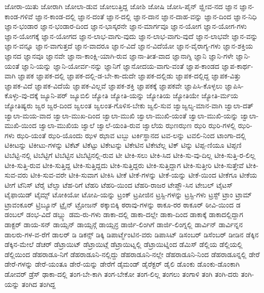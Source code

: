 {ಜೋರಾ-ಯಿತು
ಜೋರಾಗಿ
ಜೋಲಾ-ಡುವ
ಜೋಲುತ್ತಿದ್ದ
ಜೋಶಿ
ಜೋಷಿ
ಜೋಸಿ-ಪೈನ್
ಜ್ಝೀವ-ನದ
ಜ್ಞಾನ
ಜ್ಞಾನ-ಕಾಂಡ-ಗಳಿವೆ
ಜ್ಞಾನ-ಕಾಂಡ-ದಲ್ಲಿ
ಜ್ಞಾನ-ದಂತೆ
ಜ್ಞಾನ-ದಲ್ಲಿ
ಜ್ಞಾನ-ದಾನ
ಜ್ಞಾನ-ದಾಹ-ವನ್ನು
ಜ್ಞಾನ-ದಿಂದ
ಜ್ಞಾನ-ನಿಧಿ
ಜ್ಞಾನ-ಭಂಡಾರ
ಜ್ಞಾನ-ಭಂಡಾರ-ದಿಂದ
ಜ್ಞಾನ-ಭಾಸ್ಕರನೇ
ಜ್ಞಾನ-ಮಾರ್ಗವೂ
ಜ್ಞಾನ-ಯೋಗ
ಜ್ಞಾನ-ಯೋಗ-ಗಳು
ಜ್ಞಾನ-ಯೋಗಕ್ಕೆ
ಜ್ಞಾನ-ಯೋಗದ
ಜ್ಞಾನ-ಲಾಭ-ವಾಗು-ವುದು
ಜ್ಞಾನ-ಲಾಭ-ವಾಗು-ವುದೆ
ಜ್ಞಾನ-ಲಾಭವೇ
ಜ್ಞಾನ-ವನ್ನು
ಜ್ಞಾನ-ವನ್ನೂ
ಜ್ಞಾನ-ವಾಗುತ್ತದೆ
ಜ್ಞಾನ-ವಾದರೂ
ಜ್ಞಾನ-ವಿದೆ
ಜ್ಞಾನ-ವಿದೆಯೋ
ಜ್ಞಾನ-ವೈರಾಗ್ಯ-ಗಳು
ಜ್ಞಾನ-ಶಕ್ತಿಯ
ಜ್ಞಾನದ
ಜ್ಞಾನವೂ
ಜ್ಞಾನವೇ
ಜ್ಞಾನಾ-ಕಾಂಕ್ಷಿ-ಯಾಗಿ-ರುವ
ಜ್ಞಾನಾ-ತೀತ-ವಾದ
ಜ್ಞಾನಾಗ್ನಿ
ಜ್ಞಾನಿ
ಜ್ಞಾನಿ-ಗಳೇ
ಜ್ಞಾನಿ-ಯಂತೆ
ಜ್ಞಾನಿ-ಯನ್ನು
ಜ್ಞಾನಿ-ಯೋರ್ವ-ನನ್ನು
ಜ್ಞಾನಿಗೆ
ಜ್ಞಾನೋದಯ-ವಾಗು-ವಂತೆ
ಜ್ಞಾಪ-ಕಾಂಡದ
ಜ್ಞಾಪ-ಕಾರ್ಥ-ವಾಗಿ
ಜ್ಞಾಪಕ
ಜ್ಞಾಪಕ-ದಲ್ಲಿ
ಜ್ಞಾಪಕ-ದಲ್ಲಿ-ಡ-ಬೇ-ಕಾ-ದುದೇ
ಜ್ಞಾಪಕ-ದಲ್ಲಿಡು
ಜ್ಞಾಪಕ-ದಲ್ಲಿದ್ದ
ಜ್ಞಾಪಕ-ವಿತ್ತು
ಜ್ಞಾಪಕ-ವಿದೆ
ಜ್ಞಾಪಕ-ವಿದೆಯೆ
ಜ್ಞಾಪಕ-ವಿಲ್ಲವೆ
ಜ್ಞಾಪಕ-ಶಕ್ತಿ
ಜ್ಞಾಪಕಕ್ಕೆ
ಜ್ಞಾಪಕವೇ
ಜ್ಞಾಪಿಸಿ-ಕೊಳ್ಳಲು
ಜ್ಞಾಪಿಸಿ-ಕೊಳ್ಳು-ವು-ದಕ್ಕೆ
ಜ್ಯೂನಿ-ಪರ್
ಜ್ಯೂಬಿಲಿ
ಜ್ಯೋತಿ
ಜ್ಯೋತಿ-ಯನ್ನು
ಜ್ಯೋತಿಯ
ಜ್ಯೋತಿಯೇ
ಜ್ಯೋತಿ-ರ್ಮಯ
ಜ್ಯೋತಿಷ್ಯರು
ಜ್ವರ
ಜ್ವರ-ದಿಂದ
ಜ್ವಲಂತ
ಜ್ವಲಂತ-ಗೊಳಿಸ-ಬೇಕು
ಜ್ವಲಿ-ಸುವ
ಜ್ವಾಜ್ವಲ್ಯ-ಮಾನ-ವಾಗಿ
ಜ್ವಾಲಾ-ದತ್
ಜ್ವಾಲಾ-ಮಯ-ವಾದ
ಜ್ವಾಲಾ-ಮುಖ-ದಿಂದ
ಜ್ವಾಲಾ-ಮುಖಿ
ಜ್ವಾಲಾ-ಮುಖಿ-ಯಂತೆ
ಜ್ವಾಲಾ-ಮುಖಿ-ಯನ್ನು
ಜ್ವಾಲಾ-ಮುಖಿ-ಯಿಂದ
ಜ್ವಾಲಾ-ಮುಖಿಯ
ಜ್ವಾಲೆ
ಜ್ವಾಲೆ-ಯಂತಿ-ರುವ
ಜ್ವಾಲೆಯ
ಝಣಝಣ
ಝರಿ
ಝರಿ-ಗಳಲ್ಲಿ
ಝರಿ-ಗಳು
ಝರಿ-ಯಂತೆ
ಝರಿ-ಯೊಂದು
ಝಳ
ಝಾವ
ಟಬ್ಬು
ಟರ್ಕಿಸ್ಥಾನದ
ಟವ-ಲನ್ನು
ಟವಲಿ-ನಿಂದ
ಟಾಂಗಾ-ದಲ್ಲಿ
ಟಿಕೀಟನ್ನು
ಟಿಕೀಟು-ಗಳನ್ನು
ಟಿಕೆಟ್
ಟಿಕೆಟ್ಟು
ಟಿಕೇಟನ್ನು
ಟಿಕೇಟಿನ
ಟಿಕೇಟೆಲ್ಲ
ಟಿಕ್
ಟಿನ್ನು
ಟಿಪ್ಪ-ಣಿಯೂ
ಟಿಪ್ಪಣಿ
ಟಿಬೆಟ್ಟಿ-ನಲ್ಲಿ
ಟಿಬೆಟ್ಟಿಗೆ
ಟಿಬೆಟ್ಟಿನ
ಟಿಬೆಟ್ಟಿನಲ್ಲಿ-ರುವ
ಟೀ
ಟೀಕಿ-ಸಲು
ಟೀಕಿ-ಸಿದ
ಟೀಕಿ-ಸು-ವು-ದಿಲ್ಲ
ಟೀಕಿ-ಸುತ್ತಿ-ರ-ಲಿಲ್ಲ
ಟೀಕಿ-ಸುತ್ತಿ-ರುವ
ಟೀಕಿ-ಸುತ್ತಿದ್ದ
ಟೀಕಿ-ಸುತ್ತಿದ್ದದು
ಟೀಕಿ-ಸುತ್ತಿದ್ದರು
ಟೀಕಿ-ಸುತ್ತಿದ್ದಾಗ
ಟೀಕಿ-ಸುತ್ತೀರಿ
ಟೀಕಿ-ಸುತ್ತೇವೆ
ಟೀಕಿ-ಸುವ-ವರು
ಟೀಕಿ-ಸುವ-ವರೇ
ಟೀಕಿ-ಸುವಾಗ
ಟೀಕಿಸಿ
ಟೀಕೆ
ಟೀಕೆ-ಗಳನ್ನು
ಟೀಕೆ-ಯನ್ನು
ಟೀಕೆ-ಯಿಂದ
ಟೀಕೆಗೂ
ಟೀಕೆಯ
ಟೀಗೆ
ಟೆನಿಸ್
ಟೆರೈ
ಟೆಲ್ಸಾ
ಟೆಹ-ರಿಗೆ
ಟೆಹರಿ
ಟೆಹರಿ-ಯಿಂದ
ಟೆಹರಿ-ರಾಜರ
ಟೇಪ್ಹೌ-ಸಿನ
ಟೇಬಲ್
ಟೈಟಸ್
ಟೈಫಾಯಿಡ್
ಟೈಮ್ಸ್
ಟೋಕಿಯೋ
ಟೋಪಿ-ಯನ್ನು
ಟ್ರಂಕ್
ಟ್ರಪೀಜಿನ
ಟ್ರಸ್ಟಿ-ಗಳನ್ನು
ಟ್ರಸ್ಟಿ-ಗಳು
ಟ್ರಸ್ಟ್
ಟ್ರಾಂ
ಟ್ರಾಮ್
ಟ್ರಾವಂಕೂರ್
ಟ್ರಿಬ್ಯೂನ್
ಟ್ರೈನ್
ಟ್ರೋಜನ್
ಠಕ್ಕಾಬಿಕ್ಕಿ
ಠರಾವು-ಗಳನ್ನು
ಠಾಕೂ-ರರ
ಠಾಕೂರ್
ಠೀವಿ-ಯಿಂದ
ಡ
ಡಂಬಲ್
ಡಂಭ-ವಿದೆ
ಡಬ್ಲ್ಯು
ಡಮ-ರು-ಗಳು
ಡಾಕಾ-ದಲ್ಲಿ
ಡಾಕಾ-ದಲ್ಲೇ
ಡಾಕಾ-ದಿಂದ
ಡಾಕಾಕ್ಕೆ
ಡಾಕಾದಲ್ಲಿದ್ದಾಗ
ಡಾಕ್ಟರ್
ಡಾಯ-ಸನ್
ಡಾಯ್ಸನ್
ಡಾಯ್ಸನ್ಗೆ
ಡಾಯ್ಸನ್ರ
ಡಾರ್ಜಿ-ಲಿಂಗಿಗೆ
ಡಾರ್ಜಿ-ಲಿಂಗ್ನಲ್ಲಿ
ಡಾರ್ವಿನ್
ಡಾರ್ವಿನ್ನನ
ಡಾಲರು-ಗಳ-ವ-ರೆಗೆ
ಡಾಲರ್
ಡಿ
ಡಿಕನ್ಸ್
ಡಿಕ್ಕಿ
ಡಿಪಾರ್ಟ್ಮೆಂಟಿನ-ವರು
ಡಿಪಾಸಿಟ್
ಡಿಸಂಬರ್
ಡಿಸೆಂಬರ್
ಡೀಡಿನ
ಡೆಕ್ಕಿನ
ಡೆಕ್ಕಿನ-ಮೇಲೆ
ಡೆಚರ್
ಡೆಟ್ರಾಯಿಟ್
ಡೆಟ್ರಾಯಿಟ್ಗೆ
ಡೆಟ್ರಾಯಿಟ್ನಲ್ಲಿ
ಡೆಟ್ರಾಯಿಟ್ನಿಂದ
ಡೆಮಿಸ್
ಡೆಲ್ಲಿಯ
ಡೆಲ್ಲಿಯಲ್ಲಿ
ಡೆಲ್ಲಿಯಿಂದ
ಡೆಹರಾಡೂ-ನಿಗೆ
ಡೆಹರಾಡೂನಿ-ನಲ್ಲಿದ್ದು
ಡೆಹರಾಡೂನಿ-ನಲ್ಲೇ
ಡೆಹರಾಡೂನಿ-ನಿಂದ
ಡೆಹರಾಡೂನ್ನಲ್ಲಿ
ಡೇರೆ
ಡೇರೆ-ಗಳನ್ನು
ಡೇರೆ-ಯಂತೂ
ಡೇರೆ-ಯನ್ನು
ಡೇರೆಗೆ
ಡೈಮಂಡ್
ಡೈರೆಕ್ಟರ್
ಡೈಲಿ
ಡೊಂಕು
ಡೊಂಕು-ಡೊಂಕಾಗಿ
ಡೋವರ್
ಡ್ರೆಸ್
ಢಾಕಾ-ದಲ್ಲಿ
ತಂಗ-ಬೇ-ಕಾಗಿ
ತಂಗ-ಬೇಕೋ
ತಂಗ-ಲಿಲ್ಲ
ತಂಗಲು
ತಂಗಾಳಿ
ತಂಗಿ
ತಂಗಿ-ದರು
ತಂಗಿ-ಯನ್ನು
ತಂಗಿದ
ತಂಗಿದ್ದ
}
